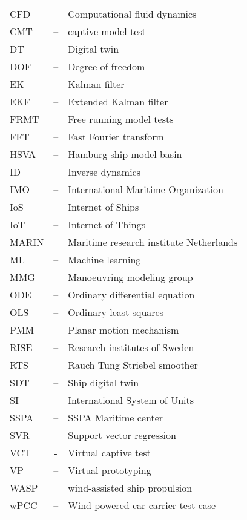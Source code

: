 
\begin{tabular}{ l c l }
CFD & -- & Computational fluid dynamics\\
CMT & -- & captive model test \\
DT  & -- & Digital twin\\
DOF & -- & Degree of freedom\\
EK & -- & Kalman filter \\
EKF & -- & Extended Kalman filter \\
FRMT & -- & Free running model tests \\
FFT & -- & Fast Fourier transform\\
HSVA & -- & Hamburg ship model basin \\
ID & -- & Inverse dynamics \\
IMO & -- & International Maritime Organization \\
IoS & -- & Internet of Ships \\
IoT & -- & Internet of Things \\
MARIN & -- & Maritime research institute Netherlands \\
ML & -- & Machine learning \\
MMG & -- & Manoeuvring modeling group \\
ODE & -- & Ordinary differential equation\\
OLS & -- & Ordinary least squares\\
PMM & -- & Planar motion mechanism \\ 
RISE & -- & Research institutes of Sweden \\
RTS & -- & Rauch Tung Striebel smoother \\
SDT  & -- & Ship digital twin\\
SI  & -- & International System of Units\\
SSPA & -- & SSPA Maritime center \\
SVR & -- & Support vector regression \\
VCT & - & Virtual captive test \\
VP & -- & Virtual prototyping \\
WASP & -- & wind-assisted ship propulsion \\
wPCC & -- & Wind powered car carrier test case\\
\end{tabular}
